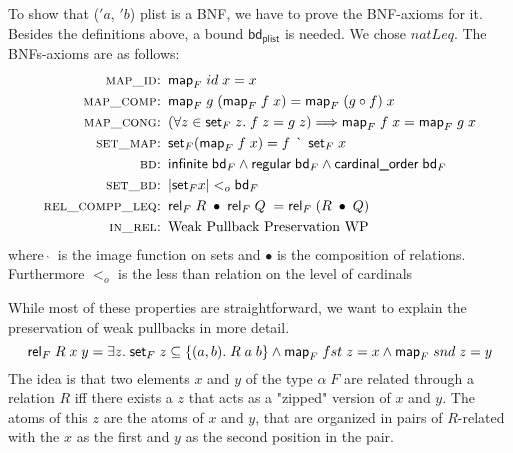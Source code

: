     To show that \textsf{($'a$, $'b$) plist} is a \ac{BNF}, we have to prove the \ac{BNF}-axioms for it. Besides the definitions above, a bound $\textsf{bd}_\textsf{plist}$ is needed. We chose $natLeq$. %
    The \acp{BNF}-axioms are as follows:
    \begin{align}
      \textsc{map\_id: }& \textsf{map}_F\; id\; x = x\\
      \textsc{map\_comp: }& \textsf{map}_F\; g\; (\textsf{map}_F\; f\; x) = \textsf{map}_F\; (g \circ f)\; x\\
      \textsc{map\_cong: }& (\forall z \in \textsf{set}_F\; z.\; f\; z = g\; z) \Longrightarrow 
        \textsf{map}_F\; f\; x = \textsf{map}_F\; g\; x\\
      \textsc{set\_map: }& \textsf{set}_F (\textsf{map}_F\; f\; x) = f\; \grave{\phantom{\_}}\; \textsf{set}_F\; x\\
      \textsc{bd: }& \textsf{infinite}\; \textsf{bd}_F \land 
        \textsf{regular}\; \textsf{bd}_F \land 
        \textsf{cardinal\_order}\; \textsf{bd}_F\\
      \textsc{set\_bd: }& | \textsf{set}_F x | <_o \textsf{bd}_F\\
      \textsc{rel\_compp\_leq: }& \textsf{rel}_F\; R\; \bullet\; \textsf{rel}_F\; Q\; = 
        \textsf{rel}_F\; (R\; \bullet\; Q)\\
      \textsc{in\_rel: }& \text{Weak Pullback Preservation WP}
    \end{align}
    \noindent where $\grave{\phantom{\_}}$ is the image function on sets and $\bullet$ is the composition of relations. Furthermore $<_o$ is the less than relation on the level of cardinals

    While most of these properties are straightforward, we want to explain the preservation of weak pullbacks in more detail.
    \begin{equation}
      \text{\textsf{rel}}_F\; R\; x\; y = \exists z.\; \text{\textsf{set}}_F\; z \subseteq \{(a, b).\; R\; a\; b \} \land 
        \text{\textsf{map}}_F\; fst\; z = x \land \text{\textsf{map}}_F\; snd\; z = y \label{eq:WP}
    \end{equation}
    The idea is that two elements $x$ and $y$ of the type $\alpha\; F$ are related through a relation $R$ iff there exists a $z$ that acts as a "zipped" version of $x$ and $y$. The atoms of this $z$ are the atoms of $x$ and $y$, that are organized in pairs of $R$-related with the $x$ as the first and $y$ as the second position in the pair.

